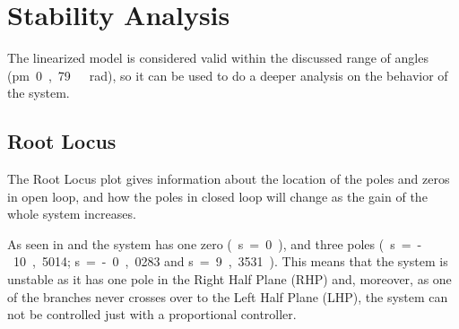 \section{Stability Analysis}\label{sec:stabilityAnalysis}
The linearized model is considered valid within the discussed range of angles (\si{\pm 0,79\ rad}), so it can be used to do a deeper analysis on the behavior of the system. %

%
%
%

\subsection{Root Locus}
The Root Locus plot gives information about the location of the poles and zeros in open loop, and how the poles in closed loop will change as the gain of the whole system increases.

As seen in  and  the system has one zero \si{(s=0)}, and three poles \si{(s=-10,5014}; \si{s=-0,0283} and \si{s=9,3531)}. This means that the system is unstable as it has one pole in the Right Half Plane (RHP) and, moreover, as one of the branches never crosses over to the Left Half Plane (LHP), the system can not be controlled just with a proportional controller.

